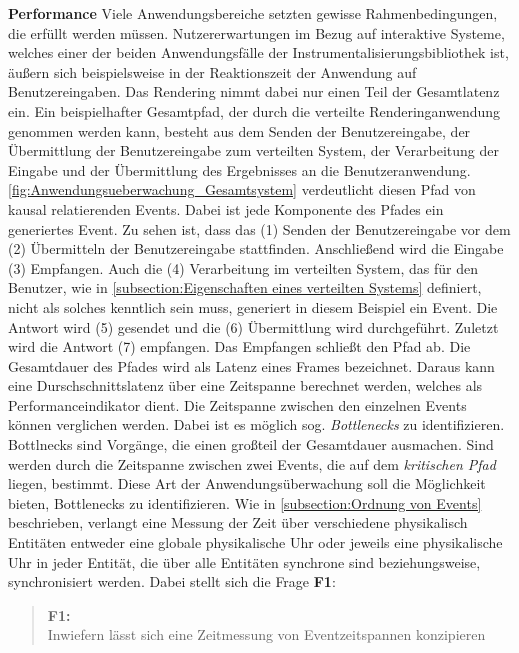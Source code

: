 \textbf{Performance} \space\space\space 
Viele Anwendungsbereiche setzten gewisse Rahmenbedingungen, die erfüllt werden müssen. 
Nutzererwartungen im Bezug auf interaktive Systeme, welches einer der beiden Anwendungsfälle der Instrumentalisierungsbibliothek ist, äußern sich beispielsweise in der Reaktionszeit der Anwendung auf Benutzereingaben. 
Das Rendering nimmt dabei nur einen Teil der Gesamtlatenz ein.
Ein beispielhafter Gesamtpfad, der durch die verteilte Renderinganwendung genommen werden kann, besteht aus dem Senden der Benutzereingabe, der Übermittlung der Benutzereingabe zum verteilten System, der Verarbeitung der Eingabe und der Übermittlung des Ergebnisses an die Benutzeranwendung.
\cref{fig:Anwendungsueberwachung_Gesamtsystem} verdeutlicht diesen Pfad von kausal relatierenden Events.
Dabei ist jede Komponente des Pfades ein generiertes Event.
Zu sehen ist, dass das (1) Senden der Benutzereingabe vor dem (2) Übermitteln der Benutzereingabe stattfinden.
Anschließend wird die Eingabe (3) Empfangen.
Auch die (4) Verarbeitung im verteilten System, das für den Benutzer, wie in \cref{subsection:Eigenschaften eines verteilten Systems} definiert, nicht als solches kenntlich sein muss, generiert in diesem Beispiel ein Event.
Die Antwort wird (5) gesendet und die (6) Übermittlung wird durchgeführt.
Zuletzt wird die Antwort (7) empfangen. Das Empfangen schließt den Pfad ab. Die Gesamtdauer des Pfades wird als Latenz eines Frames bezeichnet.
Daraus kann eine Durschschnittslatenz über eine Zeitspanne berechnet werden, welches als Performanceindikator dient. Die Zeitspanne zwischen den einzelnen Events können verglichen werden. Dabei ist es möglich sog. \emph{Bottlenecks} zu identifizieren. Bottlnecks sind Vorgänge, die einen großteil der Gesamtdauer ausmachen. Sind werden durch die Zeitspanne zwischen zwei Events, die auf dem \emph{kritischen Pfad} liegen, bestimmt. Diese Art der Anwendungsüberwachung soll die Möglichkeit bieten, Bottlenecks zu identifizieren. Wie in \cref{subsection:Ordnung von Events} beschrieben, verlangt eine Messung der Zeit über verschiedene physikalisch Entitäten entweder eine globale physikalische Uhr oder jeweils eine physikalische Uhr in jeder Entität, die über alle Entitäten synchrone sind beziehungsweise, synchronisiert werden. Dabei stellt sich die Frage \textbf{F1}:

\begin{quote}
	\cbstart
		\textbf{F1:}\\
		Inwiefern lässt sich eine Zeitmessung von Eventzeitspannen konzipieren
	\cbend
\end{quote}

